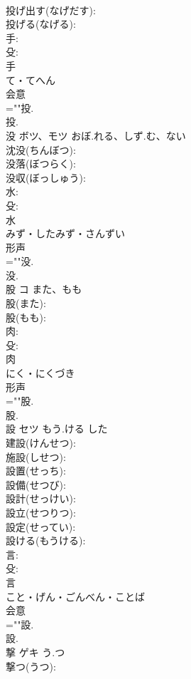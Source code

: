 \documentclass[8pt]{extreport}
\begin{document}
\begin{CJK}{UTF8}{min}
\\	投げ出す(なげだす): 
\\	投げる(なげる): 
\\	手: 
\\	殳: 
\\	手	
\\	て・てへん	
\\	会意 
\\	=""投.
\\	投.
\\	没	ボツ、モツ	おぼ.れる、しず.む、ない		
\\	沈没(ちんぼつ): 
\\	没落(ぼつらく): 
\\	没収(ぼっしゅう): 
\\	水: 
\\	殳: 
\\	水	
\\	みず・したみず・さんずい	
\\	形声 
\\	=""没.
\\	没.
\\	股	コ	また、もも		
\\	股(また): 
\\	股(もも): 
\\	肉: 
\\	殳: 
\\	肉	
\\	にく・にくづき	
\\	形声 
\\	=""股.
\\	股.
\\	設	セツ	もう.ける	した	
\\	建設(けんせつ): 
\\	施設(しせつ): 
\\	設置(せっち): 
\\	設備(せつび): 
\\	設計(せっけい): 
\\	設立(せつりつ): 
\\	設定(せってい): 
\\	設ける(もうける): 
\\	言: 
\\	殳: 
\\	言	
\\	こと・げん・ごんべん・ことば	
\\	会意 
\\	=""設.
\\	設.
\\	撃	ゲキ	う.つ		
\\	撃つ(うつ): 

\end{CJK}
\end{document}

